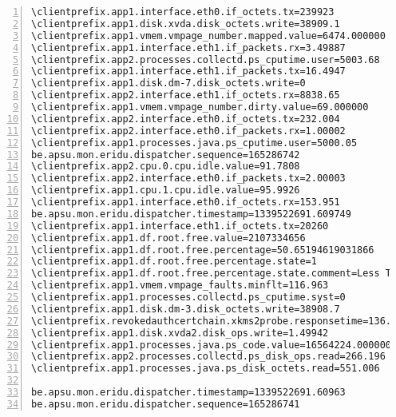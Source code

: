 \documentclass[10pt]{article}
\begin{document}
\begin{Verbatim}[numbers=left,commandchars=\\\{\},numbersep=6pt,fontsize=\small,formatcom=\color{light-gray}]
\clientprefix.app1.interface.eth0.if_octets.tx=239923
\clientprefix.app1.disk.xvda.disk_octets.write=38909.1
\clientprefix.app1.vmem.vmpage_number.mapped.value=6474.000000
\clientprefix.app1.interface.eth1.if_packets.rx=3.49887
\clientprefix.app2.processes.collectd.ps_cputime.user=5003.68
\clientprefix.app1.interface.eth1.if_packets.tx=16.4947
\clientprefix.app1.disk.dm-7.disk_octets.write=0
\clientprefix.app2.interface.eth1.if_octets.rx=8838.65
\clientprefix.app1.vmem.vmpage_number.dirty.value=69.000000
\clientprefix.app2.interface.eth0.if_octets.tx=232.004
\clientprefix.app2.interface.eth0.if_packets.rx=1.00002
\clientprefix.app1.processes.java.ps_cputime.user=5000.05
be.apsu.mon.eridu.dispatcher.sequence=165286742
\clientprefix.app2.cpu.0.cpu.idle.value=91.7808
\clientprefix.app2.interface.eth0.if_packets.tx=2.00003
\clientprefix.app1.cpu.1.cpu.idle.value=95.9926
\clientprefix.app1.interface.eth0.if_octets.rx=153.951
be.apsu.mon.eridu.dispatcher.timestamp=1339522691.609749
\clientprefix.app1.interface.eth1.if_octets.tx=20260
\clientprefix.app1.df.root.free.value=2107334656
\clientprefix.app1.df.root.free.percentage=50.65194619031866
\clientprefix.app1.df.root.free.percentage.state=1
\clientprefix.app1.df.root.free.percentage.state.comment=Less Than 60% Free Space
\clientprefix.app1.vmem.vmpage_faults.minflt=116.963
\clientprefix.app1.processes.collectd.ps_cputime.syst=0
\clientprefix.app1.disk.dm-3.disk_octets.write=38908.7
\clientprefix.revokedauthcertchain.xkms2probe.responsetime=136.000000
\clientprefix.app1.disk.xvda2.disk_ops.write=1.49942
\clientprefix.app1.processes.java.ps_code.value=16564224.000000
\clientprefix.app2.processes.collectd.ps_disk_ops.read=266.196
\clientprefix.app1.processes.java.ps_disk_octets.read=551.006

be.apsu.mon.eridu.dispatcher.timestamp=1339522691.60963
be.apsu.mon.eridu.dispatcher.sequence=165286741

\end{Verbatim}
\end{document}
